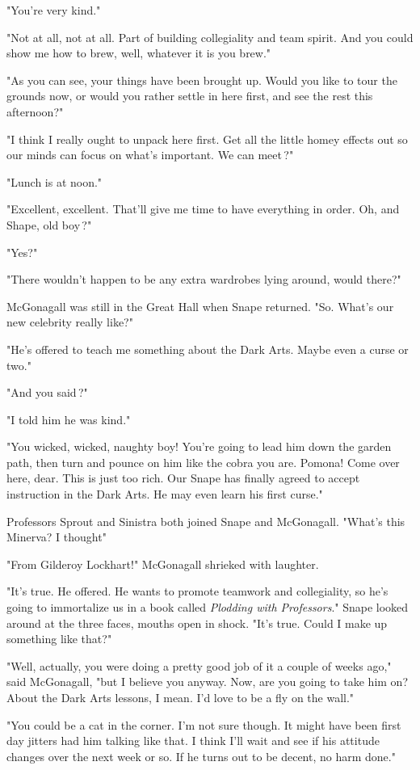"You're very kind."

"Not at all, not at all. Part of building collegiality and team spirit. And you could show me how to brew, well, whatever it is you brew."

"As you can see, your things have been brought up. Would you like to tour the grounds now, or would you rather settle in here first, and see the rest this afternoon?"

"I think I really ought to unpack here first. Get all the little homey effects out so our minds can focus on what's important. We can meet{\el}\,?"

"Lunch is at noon."

"Excellent, excellent. That'll give me time to have everything in order. Oh, and Shape, old boy{\el}\,?"

"Yes?"

"There wouldn't happen to be any extra wardrobes lying around, would there?"

McGonagall was still in the Great Hall when Snape returned. "So. What's our new celebrity really like?"

"He's offered to teach me something about the Dark Arts. Maybe even a curse or two."

"And you said{\el}\,?"

"I told him he was kind."

"You wicked, wicked, naughty boy! You're going to lead him down the garden path, then turn and pounce on him like the cobra you are. Pomona! Come over here, dear. This is just too rich. Our Snape has finally agreed to accept instruction in the Dark Arts. He may even learn his first curse."

Professors Sprout and Sinistra both joined Snape and McGonagall. "What's this Minerva? I thought{\el}"

"From Gilderoy Lockhart!" McGonagall shrieked with laughter.

"It's true. He offered. He wants to promote teamwork and collegiality, so he's going to immortalize us in a book called \emph{Plodding with Professors}." Snape looked around at the three faces, mouths open in shock. "It's true. Could I make up something like that?"

"Well, actually, you were doing a pretty good job of it a couple of weeks ago," said McGonagall, "but I believe you anyway. Now, are you going to take him on? About the Dark Arts lessons, I mean. I'd love to be a fly on the wall."

"You could be a cat in the corner. I'm not sure though. It might have been first day jitters had him talking like that. I think I'll wait and see if his attitude changes over the next week or so. If he turns out to be decent, no harm done."

